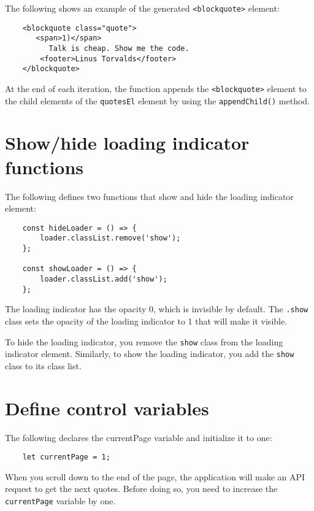 \documentclass[11pt]{article}
\begin{document}
\noindent
The following shows an example of the generated \verb|<blockquote>| element:

\begin{lstlisting}
    <blockquote class="quote">
       <span>1)</span>
          Talk is cheap. Show me the code.
        <footer>Linus Torvalds</footer>
    </blockquote>
\end{lstlisting}

\noindent
At the end of each iteration, the function appends the \verb|<blockquote>|
element to the child elements of the \verb|quotesEl| element by
using the \verb|appendChild()| method.

\section*{Show/hide loading indicator functions}

The following defines two functions that show and hide the loading indicator element:

\begin{lstlisting}
    const hideLoader = () => {
        loader.classList.remove('show');
    };

    const showLoader = () => {
        loader.classList.add('show');
    };
\end{lstlisting}

\noindent
The loading indicator has the opacity 0, which is invisible by default.
The \verb|.show| class sets the opacity of the loading indicator to 1
that will make it visible.
\newline

\noindent
To hide the loading indicator, you remove the \verb|show| class from the
loading indicator element. Similarly, to show the loading indicator,
you add the \verb|show| class to its class list.

\section*{Define control variables}

The following declares the currentPage variable and initialize it to one:

\begin{lstlisting}
    let currentPage = 1;
\end{lstlisting}

\noindent
When you scroll down to the end of the page, the application will make
an API request to get the next quotes. Before doing so, you need to
increase the \verb|currentPage| variable by one.
\newline
\end{document}
